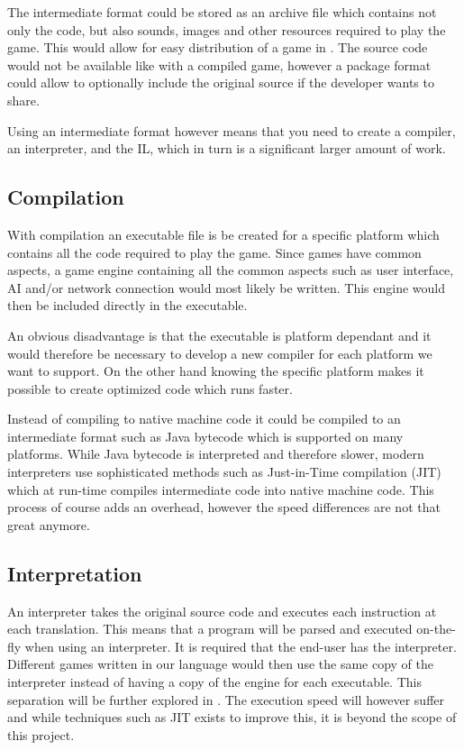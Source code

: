 The intermediate format could be stored as an archive file which contains not
only the code, but also sounds, images and other resources required to play the
game. This would allow for easy distribution of a game in \productname{}. The
source code would not be available like with a compiled game, however a package
format could allow to optionally include the original source if the developer
wants to share.

Using an intermediate format however means that you need to create a compiler,
an interpreter, and the IL, which in turn is a significant
larger amount of work.

\subsection{Compilation}
\label{sec:compilation}
With compilation an executable file is be created for a specific platform which
contains all the code required to play the game. Since games have common
aspects, a game engine containing all the common aspects such as user interface,
AI and/or network connection would most likely be written. This engine would
then be included directly in the executable.

An obvious disadvantage is that the executable is platform dependant and it
would therefore be necessary to develop a new compiler for each platform we want
to support. On the other hand knowing the specific platform makes it possible to
create optimized code which runs faster.

Instead of compiling to native machine code it could be compiled to an
intermediate format such as Java bytecode which is supported on many platforms.
While Java bytecode is interpreted and therefore slower, modern interpreters
use sophisticated methods such as Just-in-Time compilation (JIT) which at
run-time compiles intermediate code into native machine code. This process of
course adds an overhead, however the speed differences are not that great
anymore.
\cite{java-speed}

\subsection{Interpretation}
\label{sec:interpretation}
An interpreter takes the original source code and executes each instruction at
each translation. This means that a program will be parsed and executed
on-the-fly when using an interpreter. It is required that the end-user has the
interpreter. Different games written in our language would then use the same
copy of the interpreter instead of having a copy of the engine for each
executable. This separation will be further explored in
. The execution speed will however suffer and
while techniques such as JIT exists to improve this, it is beyond the scope of
this project.

